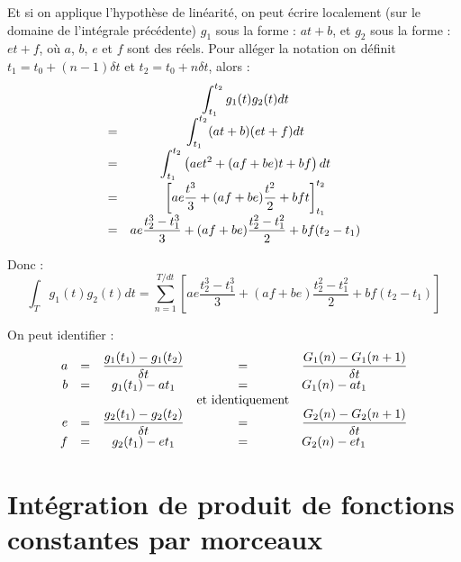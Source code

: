 Et si on applique l'hypothèse de linéarité, on peut écrire localement (sur le domaine de l'intégrale précédente) $g_1$ sous la forme : $at+b$, et $g_2$ sous la forme : $et+f$, où $a$, $b$, $e$ et $f$ sont des réels. Pour alléger la notation on définit $t_1=t_0+(n-1)\delta t$ et $t_2=t_0+n\delta t$, alors :
\begin{equation}
\begin{array}{r c}
	&\displaystyle
		\int_{t_1}^{t_2} g_1(t) g_2(t) dt
	\\
	=&\displaystyle
		\int_{t_1}^{t_2} (at+b)(et+f) dt
	\\
	=&\displaystyle
		\int_{t_1}^{t_2} \left(a e t^2 + (a f + b e) t + b f \right) dt
	\\
	=&\displaystyle
		\left[ a e \frac{t^3}{3} 
				+ (a f + b e) \frac{t^2}{2} 
				+ b f t \right]_{t_1}^{t_2}
	\\
	=&\displaystyle
		a e \frac{t_2^3 - t_1^3}{3} 
				+ (a f + b e) \frac{t_2^2 - t_1^2}{2} 
				+ b f (t_2 - t_1)
\end{array} 
\end{equation}

Donc :
\begin{equation}
	\int_T g_1(t) g_2(t) dt = \sum_{n=1}^{T/dt} 
							\left[ a e \frac{t_2^3 - t_1^3}{3} 
				+ (a f + b e) \frac{t_2^2 - t_1^2}{2} 
				+ b f (t_2 - t_1) \right]
\end{equation}

On peut identifier :
\begin{equation}
\begin{array}{r c c c l}
		a &=& \displaystyle \frac{g_1(t_1)-g_1(t_2)}{\delta t}
		  &=& \displaystyle \frac{G_1(n)  -G_1(n+1)}{\delta t}
	\\
		b &=& g_1(t_1) - at_1
		  &=& G_1(n) - at_1
	\\
		&&& $et identiquement$ &
	\\
		e &=& \displaystyle \frac{g_2(t_1)-g_2(t_2)}{\delta t}
		  &=& \displaystyle \frac{G_2(n)  -G_2(n+1)}{\delta t}
	\\
		f &=& g_2(t_1) - et_1
		  &=& G_2(n) - et_1
	
\end{array}
\end{equation}


\section{Intégration de produit de fonctions constantes par morceaux}

